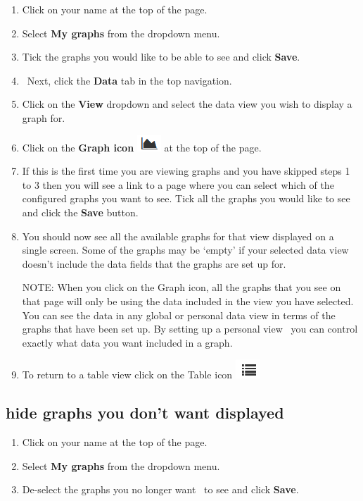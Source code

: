 \documentclass{ctrlo-int-toc}
\begin{document}
\begin{enumerate}
\item Click on your name at the top of the page.
\item Select \textbf{My graphs} from the dropdown menu.
\item Tick the graphs you would like to be able to see and click \textbf{Save}.
\item \ Next, click the \textbf{Data} tab in the top navigation.
\item Click on the \textbf{View} dropdown and select the data view you wish to display a graph for. 
\item Click on the \textbf{Graph icon}
\includegraphics[width=0.9cm,height=0.609cm]{userguide-img/userguide-img008.png}
 at the top of the page. 
\item If this is the first time you are viewing graphs and you have skipped steps 1 to 3 then you will see a link to a page where you can select which of the configured graphs you want to see. Tick all the graphs you would like to see and click the \textbf{Save} button. 
\item You should now see all the available graphs for that view displayed on a single screen. Some of the graphs may be `empty' if your selected data view doesn't include the data fields that the graphs are set up for. 
\begin{notebox}
NOTE: When you click on the Graph icon, all the graphs that you see on that page will only be using the data included in the view you have selected. You can see the data in any global or personal data view in terms of the graphs that have been set up. By setting up a personal view \ you can control exactly what data you want included in a graph. 
\end{notebox}

\item To return to a table view click on the Table icon
\includegraphics[width=0.926cm,height=0.714cm]{userguide-img/userguide-img009.png}
 
\end{enumerate}
\subsection[hide graphs you don{}'t want displayed]{hide graphs you don't want displayed}
\begin{enumerate}
\item Click on your name at the top of the page.
\item Select \textbf{My graphs} from the dropdown menu.
\item De-select the graphs you no longer want \ to see and click \textbf{Save}.
\end{enumerate}
\end{document}
